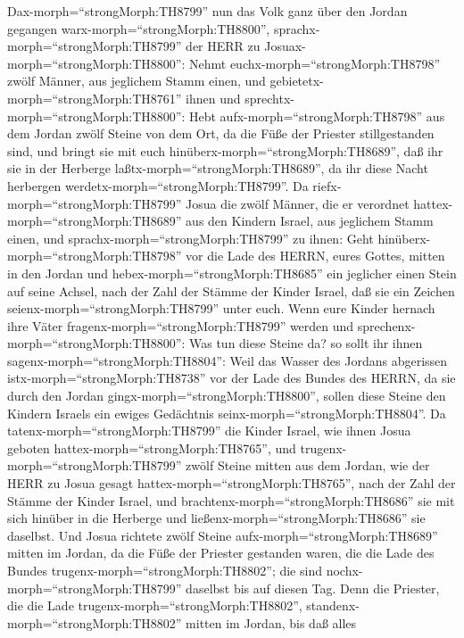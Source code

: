  Dax-morph=``strongMorph:TH8799'' nun das Volk ganz über den
Jordan gegangen warx-morph=``strongMorph:TH8800'',
sprachx-morph=``strongMorph:TH8799'' der HERR zu
Josuax-morph=``strongMorph:TH8800'':  Nehmt
euchx-morph=``strongMorph:TH8798'' zwölf Männer, aus jeglichem Stamm
einen,  und gebietetx-morph=``strongMorph:TH8761'' ihnen und
sprechtx-morph=``strongMorph:TH8800'': Hebt
aufx-morph=``strongMorph:TH8798'' aus dem Jordan zwölf Steine von dem
Ort, da die Füße der Priester stillgestanden sind, und bringt sie mit
euch hinüberx-morph=``strongMorph:TH8689'', daß ihr sie in der Herberge
laßtx-morph=``strongMorph:TH8689'', da ihr diese Nacht herbergen
werdetx-morph=``strongMorph:TH8799''.  Da
riefx-morph=``strongMorph:TH8799'' Josua die zwölf Männer, die er
verordnet hattex-morph=``strongMorph:TH8689'' aus den Kindern Israel,
aus jeglichem Stamm einen,  und
sprachx-morph=``strongMorph:TH8799'' zu ihnen: Geht
hinüberx-morph=``strongMorph:TH8798'' vor die Lade des HERRN, eures
Gottes, mitten in den Jordan und hebex-morph=``strongMorph:TH8685'' ein
jeglicher einen Stein auf seine Achsel, nach der Zahl der Stämme der
Kinder Israel,  daß sie ein Zeichen
seienx-morph=``strongMorph:TH8799'' unter euch. Wenn eure Kinder hernach
ihre Väter fragenx-morph=``strongMorph:TH8799'' werden und
sprechenx-morph=``strongMorph:TH8800'': Was tun diese Steine da?
 so sollt ihr ihnen sagenx-morph=``strongMorph:TH8804'':
Weil das Wasser des Jordans abgerissen istx-morph=``strongMorph:TH8738''
vor der Lade des Bundes des HERRN, da sie durch den Jordan
gingx-morph=``strongMorph:TH8800'', sollen diese Steine den Kindern
Israels ein ewiges Gedächtnis seinx-morph=``strongMorph:TH8804''.
 Da tatenx-morph=``strongMorph:TH8799'' die Kinder Israel,
wie ihnen Josua geboten hattex-morph=``strongMorph:TH8765'', und
trugenx-morph=``strongMorph:TH8799'' zwölf Steine mitten aus dem Jordan,
wie der HERR zu Josua gesagt hattex-morph=``strongMorph:TH8765'', nach
der Zahl der Stämme der Kinder Israel, und
brachtenx-morph=``strongMorph:TH8686'' sie mit sich hinüber in die
Herberge und ließenx-morph=``strongMorph:TH8686'' sie daselbst.
 Und Josua richtete zwölf Steine
aufx-morph=``strongMorph:TH8689'' mitten im Jordan, da die Füße der
Priester gestanden waren, die die Lade des Bundes
trugenx-morph=``strongMorph:TH8802''; die sind
nochx-morph=``strongMorph:TH8799'' daselbst bis auf diesen Tag.
 Denn die Priester, die die Lade
trugenx-morph=``strongMorph:TH8802'',
standenx-morph=``strongMorph:TH8802'' mitten im Jordan, bis daß alles
